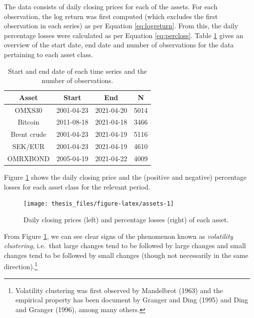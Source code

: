 \documentclass[a4paper,11pt]{article}
\theoremstyle{definition}
\theoremstyle{definition}
\theoremstyle{definition}
\theoremstyle{definition}
\theoremstyle{remark}
\begin{document}
The data consists of daily closing prices for each of the assets. For each observation, the log return was first computed (which excludes the first observation in each series) as per Equation \eqref{eq:logreturn}. From this, the daily percentage losses were calculated as per Equation \eqref{eq:percloss}. Table \ref{tab:descriptives} gives an overview of the start date, end date and number of observations for the data pertaining to each asset class.
\begin{table}[H]

\caption{\label{tab:descriptives}Start and end date of each time series and the number of observations.}
\centering
\begin{tabular}[t]{cccc}
\toprule
\textbf{Asset} & \textbf{Start} & \textbf{End} & \textbf{N}\\
\midrule
OMXS30 & 2001-04-23 & 2021-04-20 & 5014\\
Bitcoin & 2011-08-18 & 2021-04-18 & 3466\\
Brent crude & 2001-04-23 & 2021-04-19 & 5116\\
SEK/EUR & 2001-04-23 & 2021-04-19 & 4610\\
OMRXBOND & 2005-04-19 & 2021-04-22 & 4009\\
\bottomrule
\end{tabular}
\end{table}
Figure \ref{fig:assets} shows the daily closing price and the (positive and negative) percentage losses for each asset class for the relevant period.
\begin{figure}[H]

{\centering \texttt{[image: thesis\_files/figure-latex/assets-1]} 

}

\caption{Daily closing prices (left) and percentage losses (right) of each asset.}\label{fig:assets}
\end{figure}
From Figure \ref{fig:assets}, we can see clear signs of the phenomenon known as \emph{volatility clustering}, i.e.~that large changes tend to be followed by large changes and small changes tend to be followed by small changes (though not necessarily in the same direction).\footnote{Volatility clustering was first observed by Mandelbrot (1963) and the empirical property has been document by Granger and Ding (1995) and Ding and Granger (1996), among many others.}
\end{document}
